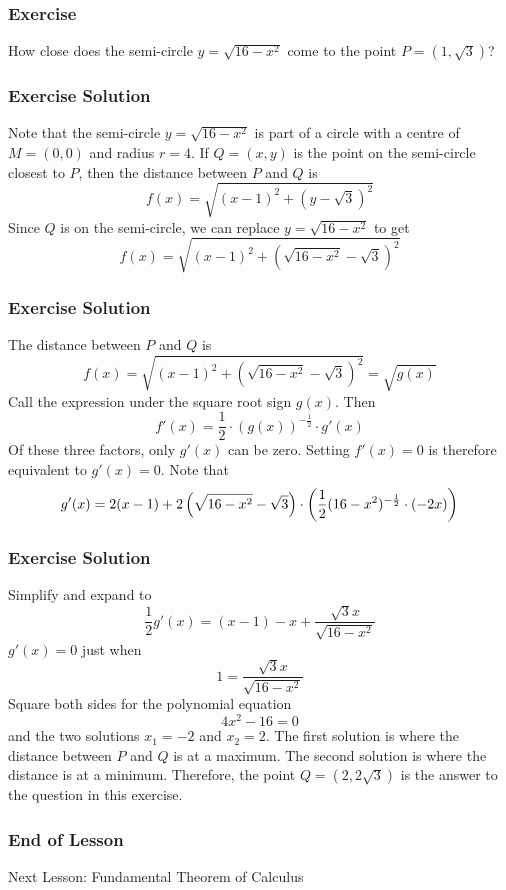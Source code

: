 \documentclass[xcolor=dvipsnames]{beamer}
\begin{document}
\begin{frame}
  \frametitle{Exercise}
  {\ubung} How close does the semi-circle $y=\sqrt{16-x^{2}}$ come to
  the point $P=(1,\sqrt{3})$?
\end{frame}

\begin{frame}
  \frametitle{Exercise Solution}
  Note that the semi-circle $y=\sqrt{16-x^{2}}$ is part of a circle
  with a centre of $M=(0,0)$ and radius $r=4$. If $Q=(x,y)$ is the
  point on the semi-circle closest to $P$, then the distance between
  $P$ and $Q$ is
\begin{equation}
  \label{eq:aziobaeg}
  f(x)=\sqrt{(x-1)^{2}+(y-\sqrt{3})^{2}}
\end{equation}
Since $Q$ is on the semi-circle, we can replace $y=\sqrt{16-x^{2}}$ to
get 
\begin{equation}
  \label{eq:shahquua}
  f(x)=\sqrt{(x-1)^{2}+(\sqrt{16-x^{2}}-\sqrt{3})^{2}}
\end{equation}
\end{frame}

\begin{frame}
  \frametitle{Exercise Solution}
  The distance between $P$ and $Q$ is
\begin{equation}
  \label{eq:ohghoote}
  f(x)=\sqrt{(x-1)^{2}+(\sqrt{16-x^{2}}-\sqrt{3})^{2}}=\sqrt{g(x)}
\end{equation}
Call the expression under the square root sign $g(x)$. Then
\begin{equation}
  \label{eq:ouwophai}
  f'(x)=\frac{1}{2}\cdot\left(g(x)\right)^{-\frac{1}{2}}\cdot{}g'(x)
\end{equation}
Of these three factors, only $g'(x)$ can be zero. Setting $f'(x)=0$ is
therefore equivalent to $g'(x)=0$. Note that
\begin{equation}
  \label{eq:poqueebo}
  g'(x)=2(x-1)+2\left(\sqrt{16-x^{2}}-\sqrt{3}\right)\cdot\left(\frac{1}{2}(16-x^{2})^{-\frac{1}{2}}\cdot(-2x)\right)\notag
\end{equation}
\end{frame}

\begin{frame}
  \frametitle{Exercise Solution}
Simplify and expand to
\begin{equation}
  \label{eq:deiquoot}
  \frac{1}{2}g'(x)=(x-1)-x+\frac{\sqrt{3}x}{\sqrt{16-x^{2}}}
\end{equation}
$g'(x)=0$ just when
\begin{equation}
  \label{eq:xoonahju}
  1=\frac{\sqrt{3}x}{\sqrt{16-x^{2}}}
\end{equation}
Square both sides for the polynomial equation
\begin{equation}
  \label{eq:uabaevoo}
4x^{2}-16=0
\end{equation}
and the two solutions $x_{1}=-2$ and $x_{2}=2$. The first solution is
where the distance between $P$ and $Q$ is at a maximum. The second
solution is where the distance is at a minimum. Therefore, the point
$Q=(2,2\sqrt{3})$ is the answer to the question in this exercise.
\end{frame}

\begin{frame}
  \frametitle{End of Lesson}
Next Lesson: Fundamental Theorem of Calculus
\end{frame}
\end{document}

